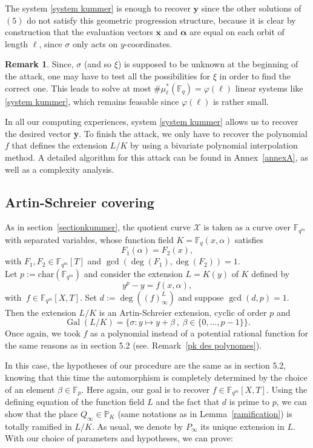\documentclass[10pt]{article}
\theoremstyle{definition}
\newtheorem{rq1}[thm]{Remark}
\theoremstyle{definition}
\theoremstyle{definition}
\newcommand{\PP}{\mathbb{P}}
\newcommand{\Fqm}{\mathbb{F}_{q^m}}
\newcommand{\Fq}{\mathbb{F}_q}
\newcommand{\X}{\mathcal{X}}
\newcommand{\Gal}{\operatorname{Gal}}
\begin{document}
The system \eqref{system kummer} is enough to recover $\mathbf{y}$ since the other solutions of $(5)$ do not satisfy this geometric progression structure, because it is clear by construction that the evaluation vectors $\mathbf{x}$ and $\boldsymbol{\alpha}$ are equal on each orbit of length $\ell$, since $\sigma$ only acts on $y$-coordinates.

\begin{rq1} Since, $\sigma$ (and so $\xi$) is supposed to be unknown at the beginning of the attack, one may have to test all the possibilities for $\xi$ in order to find the correct one. This leads to solve at most $\#\mu^*_{\ell}(\Fq) = \varphi(\ell)$ linear systems like \eqref{system kummer}, which remains feasable since $\varphi(\ell)$ is rather small.
\end{rq1}

In all our computing experiences, system \eqref{system kummer} allows us to recover the desired vector \textbf{y}. To finish the attack, we only have to recover the polynomial $f$ that defines the extension $L/K$ by using a bivariate polynomial interpolation method. A detailed algorithm for this attack can be found in Annex~\ref{annexA}, as well as a complexity analysis.

\subsection{Artin-Schreier covering} \label{sectionas}

As in section~\ref{sectionkummer}, the quotient curve $\X$ is taken as a curve over $\Fqm$ with separated variables, whose function field $K = \Fq(x,\alpha)$ satisfies 
\[F_1(\alpha) = F_2(x),\] 
with $F_1,F_2 \in \Fqm[T]$ and $\gcd(\deg(F_1),\deg(F_2))=1$. \\ 
Let $p:=\mathrm{char}(\Fqm)$ and consider the extension $L=K(y)$ of $K$ defined by
\[y^p-y = f(x,\alpha),\]
with $\ f \in \Fqm[X,T]$. Set $d:=\deg\left((f)^L_{\infty}\right)$ and suppose $\gcd(d,p)=1$. Then the extension $L/K$ is an Artin-Schreier extension, cyclic of order $p$ and 
\[\Gal(L/K) = \{ \sigma : y \mapsto y + \beta \ , \ \beta \in \{0,...,p-1\}\}.\]
Once again, we took $f$ as a polynomial instead of a potential rational function for the same reasons as in section 5.2 (see. Remark~\ref{pk des polynomes}).

In this case, the hypotheses of our procedure are the same as in section 5.2, knowing that this time the automorphism is completely determined by the choice of an element $\beta \in \mathbb{F}_p$. Here again, our goal is to recover $f \in \Fqm[X,T]$. Using the defining equation of the function field $L$ and the fact that $d$ is prime to $p$, we can show that the place $Q_{\infty} \in \PP_K$ (same notations as in Lemma~\ref{ramification}) is totally ramified in $L/K$. As usual, we denote by $P_{\infty}$ its unique extension in $L$. With our choice of parameters and hypotheses, we can prove:
\end{document}
